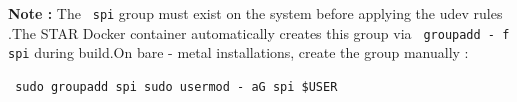 \textbf{Note :} The \texttt{
    spi} group must exist on the system before applying the udev rules
        .The STAR Docker container automatically creates this group via \texttt{
            groupadd - f spi} during build.On bare -
    metal installations,
    create the group manually :

\begin{verbatim} sudo groupadd spi sudo usermod - aG spi $USER
\end{verbatim}